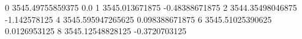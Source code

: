 0 3545.49755859375 0.0
1 3545.013671875 -0.48388671875
2 3544.35498046875 -1.142578125
4 3545.595947265625 0.098388671875
6 3545.51025390625 0.0126953125
8 3545.12548828125 -0.3720703125
